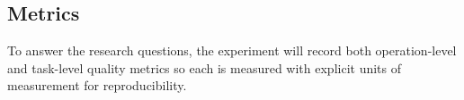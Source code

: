 











\subsection{Metrics}\label{sec:experiment:metrics}
To answer the research questions, the experiment will record both operation-level and task-level quality metrics so each is measured with explicit units of measurement for reproducibility.

